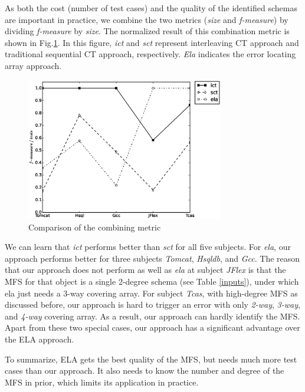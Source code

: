 \documentclass{sig-alternate}
\begin{document}
As both the cost (number of test cases) and the quality of the identified schemas are important in practice, we combine the two metrics (\emph{size} and \emph{f-measure}) by dividing \emph{f-measure} by \emph{size}. The normalized result of this combination metric is shown in Fig.\ref{cm_performance}. In this figure, \emph{ict} and \emph{sct} represent interleaving CT approach and traditional sequential CT approach, respectively. \emph{Ela} indicates the error locating array approach.

\begin{figure}[htbp]
 \includegraphics[width=3.4in]{result.eps}
\caption{Comparison of the combining metric}
\label{cm_performance}
\end{figure}

We can learn that \emph{ict} performs better than \emph{sct} for all five subjects.  For \emph{ela}, our approach performs better for three subjects \emph{Tomcat}, \emph{Hsqldb}, and \emph{Gcc}. The reason that our approach does not perform as well as \emph{ela} at subject \emph{JFlex} is that the MFS for that object is a single 2-degree schema (see Table \ref{inputs}), under which ela just needs a 3-way covering array.  For subject \emph{Tcas}, with high-degree MFS as discussed before, our approach is hard to trigger an error with only \emph{2-way}, \emph{3-way}, and \emph{4-way} covering array. As a result, our approach can hardly identify the MFS. Apart from these two special cases, our approach has a significant advantage over the ELA approach.

To summarize, ELA gets the best quality of the MFS, but needs much more test cases than our approach.  It also needs to know the number and degree of the MFS in prior, which limits its application in practice.
%
\end{document}
